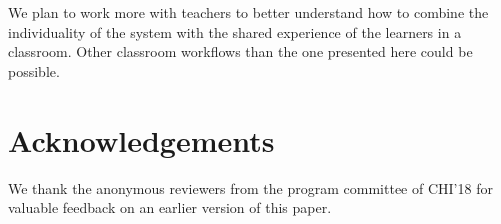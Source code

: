 We plan to work more with teachers to better understand how to combine the individuality of the system with the shared experience of the learners in a classroom. Other classroom workflows than the one presented here could be possible. 



\section{Acknowledgements}
We thank the anonymous reviewers from the program committee of CHI'18 for valuable feedback on an earlier version of this paper. 
